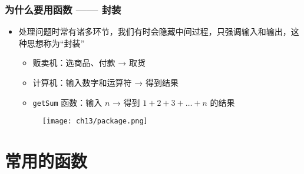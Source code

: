 \begin{frame}[fragile]
    \frametitle{为什么要用函数 —— 封装}

    \begin{itemize}
        \item 处理问题时常有诸多环节，我们有时会隐藏中间过程，只强调输入和输出，这种思想称为“封装”
        \begin{itemize}
            \item 贩卖机：选商品、付款 → 取货
            \item 计算机：输入数字和运算符 → 得到结果
            \item \lstinline|getSum| 函数：输入 $n$ → 得到 $1+2+3+\dots+n$ 的结果
        \end{itemize}

        \begin{figure}
            \texttt{[image: ch13/package.png]}
        \end{figure}
    \end{itemize}
\end{frame}

\section{常用的函数}

